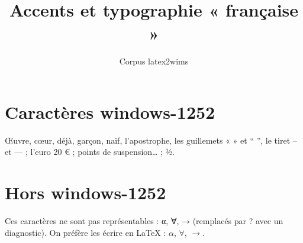 \documentclass{article}
\begin{document}
\title{Accents et typographie « française »}
\author{Corpus latex2wims}
\section{Caractères windows-1252}
Œuvre, cœur, déjà, garçon, naïf, l’apostrophe, les guillemets « » et “ ”,
le tiret – et — ; l’euro 20 € ; points de suspension… ; ½.
\section{Hors windows-1252}
Ces caractères ne sont pas représentables : α, ∀, → (remplacés par ? avec un diagnostic).
On préfère les écrire en LaTeX : \(\alpha\), \(\forall\), \(\rightarrow\).
\end{document}
